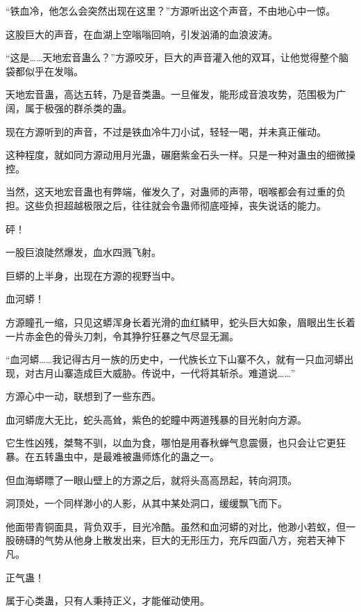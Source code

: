 
\begin{this_body}



“铁血冷，他怎么会突然出现在这里？”方源听出这个声音，不由地心中一惊。

这股巨大的声音，在血湖上空嗡嗡回响，引发汹涌的血浪波涛。

“这是……天地宏音蛊么？”方源咬牙，巨大的声音灌入他的双耳，让他觉得整个脑袋都似乎在发嗡。

天地宏音蛊，高达五转，乃是音类蛊。一旦催发，能形成音浪攻势，范围极为广阔，属于极强的群杀类的蛊。

现在方源听到的声音，不过是铁血冷牛刀小试，轻轻一喝，并未真正催动。

这种程度，就如同方源动用月光蛊，碾磨紫金石头一样。只是一种对蛊虫的细微操控。

当然，这天地宏音蛊也有弊端，催发久了，对蛊师的声带，咽喉都会有过重的负担。这些负担超越极限之后，往往就会令蛊师彻底哑掉，丧失说话的能力。

砰！

一股巨浪陡然爆发，血水四溅飞射。

巨蟒的上半身，出现在方源的视野当中。

血河蟒！

方源瞳孔一缩，只见这蟒浑身长着光滑的血红鳞甲，蛇头巨大如象，眉眼出生长着一片赤金色的骨头刀刺，令其狰狞狂暴之气尽显无漏。

“血河蟒……我记得古月一族的历史中，一代族长立下山寨不久，就有一只血河蟒出现，对古月山寨造成巨大威胁。传说中，一代将其斩杀。难道说……”

方源心中一动，联想到了一些东西。

血河蟒庞大无比，蛇头高耸，紫色的蛇瞳中两道残暴的目光射向方源。

它生性凶残，桀骜不驯，以血为食，哪怕是用春秋蝉气息震慑，也只会让它更狂暴。在五转蛊虫中，是最难被蛊师炼化的蛊之一。

但血海蟒瞟了一眼山壁上的方源之后，就将头高高昂起，转向洞顶。

洞顶处，一个同样渺小的人影，从其中某处洞口，缓缓飘飞而下。

他面带青铜面具，背负双手，目光冷酷。虽然和血河蟒的对比，他渺小若蚁，但一股磅礴的气势从他身上散发出来，巨大的无形压力，充斥四面八方，宛若天神下凡。

正气蛊！

属于心类蛊，只有人秉持正义，才能催动使用。


\end{this_body}
